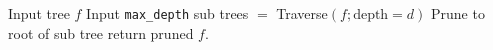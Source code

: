 \documentclass{article}
\begin{document}
\begin{preview}
	\begin{algorithmic}[1]
		
		\State Input tree $f$
		\State Input \texttt{max\_depth}
		\State sub trees $=$ Traverse$(f; \text{depth} = d)$
		\State Prune to root of sub tree
		\EndIf
		\EndFor
		\EndFor
		\State return pruned $f$.
	\end{algorithmic}
\end{preview}
\end{document}
